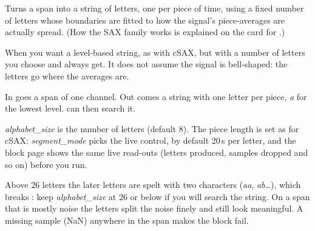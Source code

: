 Turns a span into a string of letters, one per piece of time, using a fixed number of
letters whose boundaries are fitted to how the signal's piece-averages are actually spread.
(How the SAX family works is explained on the card for .)

When you want a level-based string, as with cSAX, but with a number of letters you choose
and always get. It does not assume the signal is bell-shaped: the letters go where the
averages are.

In goes a span of one channel. Out comes a string with one letter per piece, \emph{a} for
the lowest level.  can then search it.

\emph{alphabet\_size} is the number of letters (default 8). The piece length is set as for
cSAX: \emph{segment\_mode} picks the live control, by default 20\,s per letter, and the
block page shows the same live read-outs (letters produced, samples dropped and so on)
before you run.

Above 26 letters the later letters are spelt with two characters (\emph{aa}, \emph{ab}\ldots),
which breaks : keep \emph{alphabet\_size} at 26 or below
if you will search the string. On a span that is mostly noise the letters split the noise
finely and still look meaningful. A missing sample (NaN) anywhere in the span makes the
block fail.
